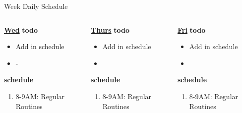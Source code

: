 \begin{block}{Week Daily Schedule}
\begin{columns}
          \begin{column}{0.14\textwidth}{\small \underline{\bf Wed}}
            \small{\bf todo}\\
            \begin{itemize}
              \tiny \item \tiny Add in schedule
            \item \tiny -
            \end{itemize} 
                {\small {\bf schedule}}\\
                \begin{enumerate} 
                  \tiny \item \tiny 8-9AM: Regular Routines 
                \end{enumerate} 
          \end{column}

          \begin{column}{0.14\textwidth}{\small \underline{\bf Thurs}}
            {\small {\bf todo}} \\ 
            \begin{itemize}
              \tiny \item \tiny Add in schedule
            \item \tiny 
            \end{itemize} 
                {\small {\bf schedule}} \\
                \begin{enumerate} 
                  \tiny \item \tiny 8-9AM: Regular Routines 
                \end{enumerate}
          \end{column} 
          
          \begin{column}{0.14\textwidth}{\small \underline{\bf Fri}}
            {\small {\bf todo}} \\ 
            \begin{itemize}
              \tiny \item \tiny Add in schedule
            \item \tiny 
            \end{itemize} 
                {\small {\bf schedule}} \\
                \begin{enumerate} 
                  \tiny \item \tiny 8-9AM: Regular Routines 
                \end{enumerate}
          \end{column}


\end{columns}
\end{block}
